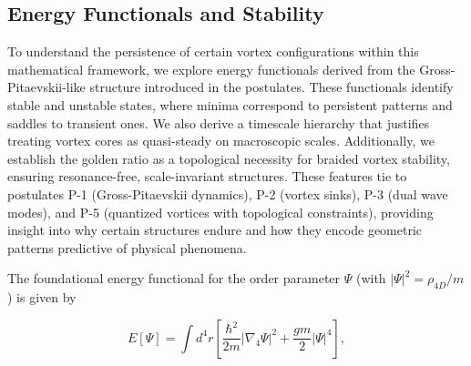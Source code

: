 
\subsection{Energy Functionals and Stability}

To understand the persistence of certain vortex configurations within this mathematical framework, we explore energy functionals derived from the Gross-Pitaevskii-like structure introduced in the postulates. These functionals identify stable and unstable states, where minima correspond to persistent patterns and saddles to transient ones. We also derive a timescale hierarchy that justifies treating vortex cores as quasi-steady on macroscopic scales. Additionally, we establish the golden ratio as a topological necessity for braided vortex stability, ensuring resonance-free, scale-invariant structures. These features tie to postulates P-1 (Gross-Pitaevskii dynamics), P-2 (vortex sinks), P-3 (dual wave modes), and P-5 (quantized vortices with topological constraints), providing insight into why certain structures endure and how they encode geometric patterns predictive of physical phenomena.

The foundational energy functional for the order parameter $\Psi$ (with $|\Psi|^2 = \rho_{4D}/m$) is given by

\begin{equation}
E[\Psi] = \int d^4 r \left[ \frac{\hbar^2}{2m} |\nabla_4 \Psi|^2 + \frac{g m}{2} |\Psi|^4 \right],
\end{equation}

